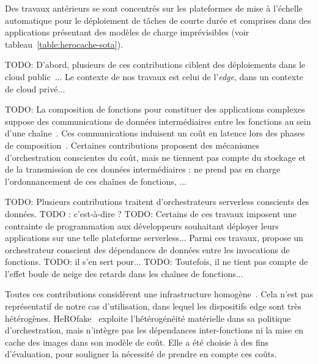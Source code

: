
Des travaux antérieurs se sont concentrés sur les plateformes de mise à l'échelle automatique pour le déploiement de tâches de courte durée et comprises dans des applications présentant des modèles de charge imprévisibles (voir tableau~\ref{table:herocache-sota}).

TODO: D'abord, plusieurs de ces contributions ciblent des déploiements dans le cloud public~\cite{}... Le contexte de nos travaux est celui de l'\textit{edge}, dans un contexte de cloud privé...

TODO: La composition de fonctions pour constituer des applications complexes suppose des communications de données intermédiaires entre les fonctions au sein d'une chaîne~\cite{}. Ces communications induisent un coût en latence lors des phases de composition~\cite{}. Certaines contributions proposent des mécanismes d'orchestration conscientes du coût, mais ne tiennent pas compte du stockage et de la transmission de ces données intermédiaires : \cite{zhangFIRSTExploitingMultiDimensional2023} ne prend pas en charge l'ordonnancement de ces chaînes de fonctions, ...

TODO: Plusieurs contributions traitent d'orchestrateurs serverless conscients des données. TODO : c'est-à-dire ?
TODO: Certains de ces travaux imposent une contrainte de programmation aux développeurs souhaitant déployer leurs applications sur une telle plateforme serverless...
Parmi ces travaux, \cite{smithFaDOFaaSFunctions2022} propose un orchestrateur conscient des dépendances de données entre les invocations de fonctions. TODO: il s'en sert pour... 
TODO: Toutefois, il ne tient pas compte de l'effet boule de neige des retards dans les chaînes de fonctions...

Toutes ces contributions considèrent une infrastructure homogène~\cite{bhasiCypressInputSizesensitive2022, zijunFassflowEfficient2022, smithFaDOFaaSFunctions2022, zhangFIRSTExploitingMultiDimensional2023, abdiPaletteLoadBalancing2023}. Cela n'est pas représentatif de notre cas d'utilisation, dans lequel les dispositifs edge sont très hétérogènes. HeROfake~\cite{herofake} exploite l'hétérogénéité matérielle dans sa politique d'orchestration, mais n'intègre pas les dépendances inter-fonctions ni la mise en cache des images dans son modèle de coût. Elle a été choisie à des fins d'évaluation, pour souligner la nécessité de prendre en compte ces coûts.

